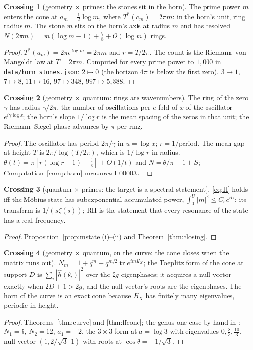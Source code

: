 \documentclass[11pt]{article}
\theoremstyle{definition}
\newtheorem{crossing}{Crossing}
\theoremstyle{remark}
\newcommand{\Tst}{T^{*}}
\newcommand{\tr}{\operatorname{tr}}
\begin{document}
\begin{crossing}[geometry $\times$ primes: the stones sit in the horn]\label{cr:horizon}
The prime power $m$ enters the cone at $a_m=\tfrac12\log m$, where $\Tst(a_m)=2\pi m$: in the horn's unit, ring radius $m$. The stone $m$ sits on the horn's axis at radius $m$ and has resolved $N(2\pi m)=m(\log m-1)+\tfrac78+O(\log m)$ rings.
\end{crossing}
\begin{proof}
$\Tst(a_m)=2\pi e^{\log m}=2\pi m$ and $r=T/2\pi$. The count is the Riemann--von Mangoldt law at $T=2\pi m$. Computed for every prime power to $1{,}000$ in \texttt{data/horn\_stones.json}: $2\mapsto0$ (the horizon $4\pi$ is below the first zero), $3\mapsto1$, $7\mapsto8$, $11\mapsto16$, $97\mapsto348$, $997\mapsto5{,}888$.
\end{proof}

\begin{crossing}[geometry $\times$ quantum: rings are wavenumbers]\label{cr:rings}
The ring of the zero $\gamma$ has radius $\gamma/2\pi$, the number of oscillations per $e$-fold of $x$ of the oscillator $e^{i\gamma\log x}$; the horn's slope $1/\log r$ is the mean spacing of the zeros in that unit; the Riemann--Siegel phase advances by $\pi$ per ring.
\end{crossing}
\begin{proof}
The oscillator has period $2\pi/\gamma$ in $u=\log x$; $r=1/\text{period}$. The mean gap at height $T$ is $2\pi/\log(T/2\pi)$, which is $1/\log r$ in radius. $\theta(t)=\pi[r(\log r-1)-\tfrac18]+O(1/t)$ and $N=\theta/\pi+1+S$; Computation~\ref{comp:horn} measures $1.00003\,\pi$.
\end{proof}

\begin{crossing}[quantum $\times$ primes: the target is a spectral statement]\label{cr:state}
\eqref{eq:H} holds iff the Möbius state has subexponential accumulated power, $\int_0^U|m|^2\le C_\varepsilon e^{\varepsilon U}$; its transform is $1/(s\zeta(s))$; $\mathrm{RH}$ is the statement that every resonance of the state has a real frequency.
\end{crossing}
\begin{proof}
Proposition~\ref{prop:mstate}(i)--(ii) and Theorem~\ref{thm:closing}.
\end{proof}

\begin{crossing}[geometry $\times$ quantum, on the curve: the cone closes when the matrix runs out]\label{cr:curve}
$N_m=1+q^m-q^{m/2}\tr e^{imH_X}$; the Toeplitz form of the cone at support $D$ is $\sum_i|\hat h(\theta_i)|^2$ over the $2g$ eigenphases; it acquires a null vector exactly when $2D+1>2g$, and the null vector's roots are the eigenphases. The horn of the curve is an exact cone because $H_X$ has finitely many eigenvalues, periodic in height.
\end{crossing}
\begin{proof}
Theorems~\ref{thm:curve} and \ref{thm:ffcone}; the genus-one case by hand in \cite{reading}: $N_1=6$, $N_2=12$, $a_1=-2$, the $3\times3$ form at $a=\log3$ with eigenvalues $0,\tfrac83,\tfrac{10}3$, null vector $(1,2/\sqrt3,1)$ with roots at $\cos\theta=-1/\sqrt3$.
\end{proof}
\end{document}
